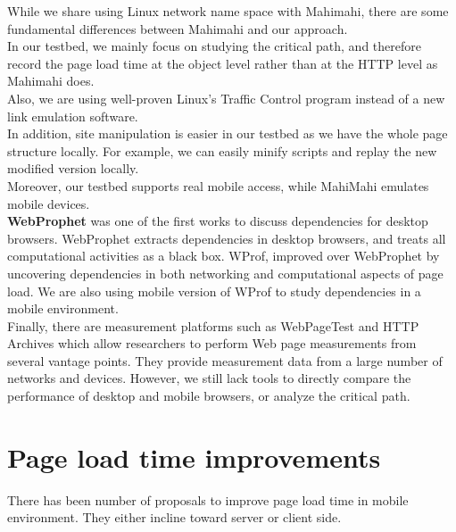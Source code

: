 \noindent While we share using Linux network name space with Mahimahi, there are  some fundamental differences between Mahimahi and  our approach. \\
In our testbed, we mainly focus on studying the critical path, and therefore record the page load time at the object
level rather than at the HTTP level as Mahimahi does.\\

\noindent Also, we are using well-proven Linux's Traffic Control program instead of a new link emulation software.\\

\noindent In addition, site manipulation is easier in our testbed as we have the whole page structure locally. For example, we can easily minify scripts and replay the new modified version locally.\\

\noindent Moreover, our testbed supports real mobile access, while MahiMahi emulates mobile devices.\\

\noindent \textbf{WebProphet} \cite{webprophet} was one of the first works to discuss dependencies for desktop browsers. WebProphet extracts dependencies in desktop browsers, and treats all computational activities as a black box. WProf, improved over WebProphet by uncovering dependencies in both networking and computational aspects of page load. We are also using mobile version of WProf to study dependencies in a mobile environment.\\

\noindent Finally, there are measurement platforms such as WebPageTest\cite{webpagetest} and HTTP Archives \cite{httparchive} which allow researchers to perform Web page measurements from several vantage points. They provide measurement data from a large number of networks and devices. However, we still lack tools to directly compare the performance of desktop and mobile browsers, or analyze the critical path.

 \section {Page load time improvements}
 There has been number of proposals to improve page load time in mobile environment. They either incline toward server or client side.
